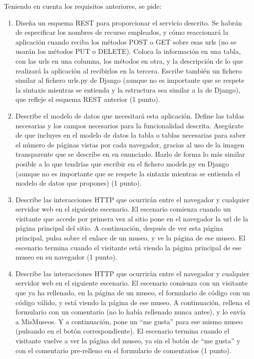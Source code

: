 {Teniendo en cuenta los requisitos anteriores, se pide:

\begin{enumerate}
\item Diseña un esquema REST para proporcionar el servicio descrito. Se habrán de especificar los nombres de recurso empleados, y cómo reaccionará la aplicación cuando reciba los métodos POST o GET sobre esas urls (no se usarán los métodos PUT o DELETE). Coloca la información en una tabla, con las urls en una columna, los métodos en otra, y la descripción de lo que realizará la aplicación al recibirlos en la tercera. Escribe también un fichero similar al fichero urls.py de Django (aunque no es importante que se respete la sintaxis mientras se entienda y la estructura sea similar a la de Django), que refleje el esquema REST anterior (1 punto).

\item Describe el modelo de datos que necesitará esta aplicación. Define las tablas necesarias y los campos necesarios para la funcionalidad descrita. Asegúrate de que incluyes en el modelo de datos la tabla o tablas necesarias para saber el número de páginas vistas por cada navegador, gracias al uso de la imagen transparente que se describe en en enunciado. Hazlo de forma lo más similar posible a lo que tendrías que escribir en el fichero models.py en Django (aunque no es importante que se respete la sintaxis mientras se entienda el modelo de datos que propones) (1 punto).

\item Describe las interacciones HTTP que ocurrirán entre el navegador y cualquier servidor web en el siguiente escenario. El escenario comienza cuando un visitante que accede por primera vez al sitio pone en el navegador la url de la página principal del sitio. A continuación, después de ver esta página principal, pulsa sobre el enlace de un museo, y ve la página de ese museo. El escenario termina cuando el visitante está viendo la página principal de ese museo en su navegador (1 punto).

\item Describe las interacciones HTTP que ocurrirán entre el navegador y cualquier servidor web en el siguiente escenario. El escenario comienza con un visitante que ya ha rellenado, en la página de un museo, el formulario de código con un código válido, y está viendo la página de ese museo. A continuación, rellena el formulario con un comentario (no lo había rellenado nunca antes), y lo envía a MisMuseos. Y a continuación, pone un ``me gusta'' para ese mismo museo (pulsando en el botón correspondiente). El escenario termina cuando el visitante vuelve a ver la página del museo, ya sin el botón de ``me gusta'' y con el comentario pre-relleno en el formulario de comentarios (1 punto).


\end{enumerate}}

